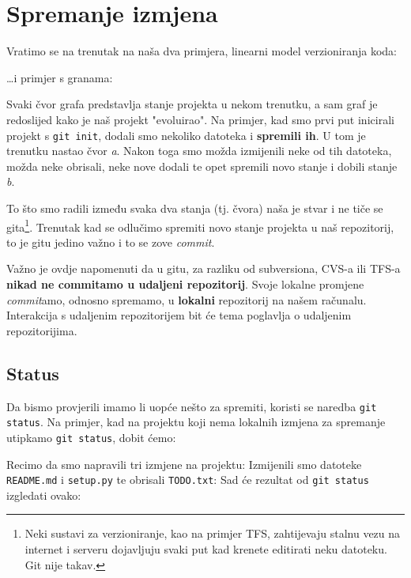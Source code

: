 \chapter*{Spremanje izmjena}

Vratimo se na trenutak na naša dva primjera, linearni model verzioniranja koda:



\dots{}i primjer s granama:



Svaki čvor grafa predstavlja stanje projekta u nekom trenutku, a sam graf je redoslijed kako je naš projekt "evoluirao".
Na primjer, kad smo prvi put inicirali projekt s \verb+git init+, dodali smo nekoliko datoteka i \textbf{spremili ih}. 
U tom je trenutku nastao čvor \emph a.
Nakon toga smo možda izmijenili neke od tih datoteka, možda neke obrisali, neke nove dodali te opet spremili novo stanje i dobili stanje \emph b.

To što smo radili između svaka dva stanja (tj. čvora) naša je stvar i ne tiče se gita\footnote{Neki sustavi za verzioniranje, kao na primjer TFS, zahtijevaju stalnu vezu na internet i serveru dojavljuju svaki put kad krenete editirati neku datoteku. Git nije takav.}.
Trenutak kad se odlučimo spremiti novo stanje projekta u naš repozitorij, to je gitu jedino važno i to se zove \emph{commit}.

Važno je ovdje napomenuti da u gitu, za razliku od subversiona, CVS-a ili TFS-a \textbf{nikad ne commitamo u udaljeni repozitorij}. 
Svoje lokalne promjene \emph{commit}amo, odnosno spremamo, u \textbf{lokalni} repozitorij na našem računalu.
Interakcija s udaljenim repozitorijem bit će tema poglavlja o udaljenim repozitorijima.

\section*{Status}

Da bismo provjerili imamo li uopće nešto za spremiti, koristi se naredba \verb+git status+.
Na primjer, kad na projektu koji nema lokalnih izmjena za spremanje utipkamo \verb+git status+, dobit ćemo:



Recimo da smo napravili tri izmjene na projektu:
Izmijenili smo datoteke \verb+README.md+ i \verb+setup.py+ te obrisali \verb+TODO.txt+:
Sad će rezultat od \verb+git status+ izgledati ovako:

